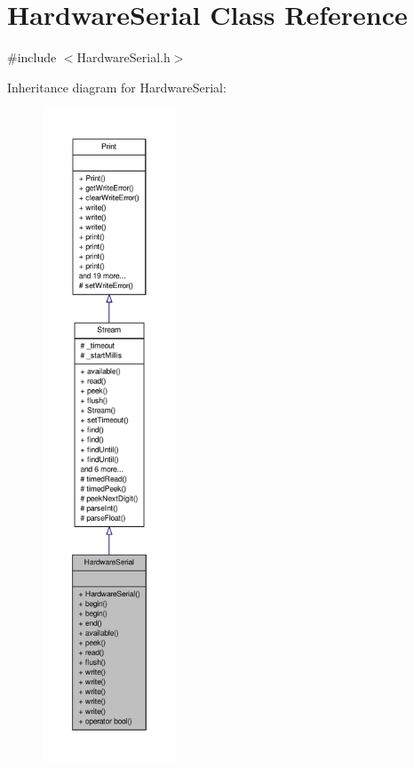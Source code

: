 \hypertarget{class_hardware_serial}{\section{Hardware\-Serial Class Reference}
\label{class_hardware_serial}
}


{\ttfamily \#include $<$Hardware\-Serial.\-h$>$}



Inheritance diagram for Hardware\-Serial\-:
\nopagebreak
\begin{figure}[H]
\begin{center}
\leavevmode
\includegraphics[height=550pt]{class_hardware_serial__inherit__graph}
\end{center}
\end{figure}


